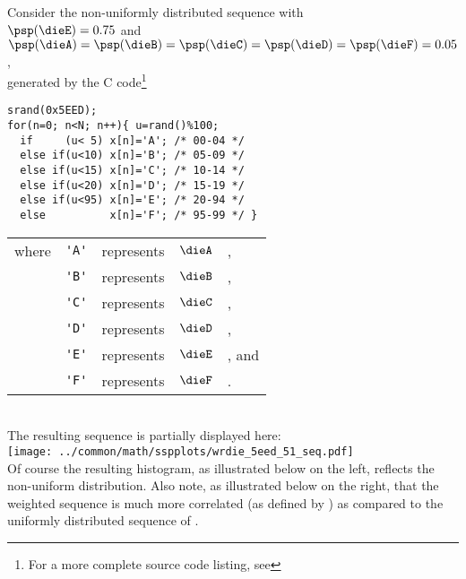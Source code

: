 \begin{example}
\label{ex:wrdie_sha}
Consider the non-uniformly distributed   sequence with 
    \\\indentx$\psp(\dieE)=0.75$ and $\psp(\dieA)=\psp(\dieB)=\psp(\dieC)=\psp(\dieD)=\psp(\dieF)=0.05$,\\
    generated by the C code\footnote{For a more complete source code listing, see }
\\\begin{minipage}{85mm}%
\begin{lstlisting}
srand(0x5EED);
for(n=0; n<N; n++){ u=rand()%100;
  if     (u< 5) x[n]='A'; /* 00-04 */ 
  else if(u<10) x[n]='B'; /* 05-09 */ 
  else if(u<15) x[n]='C'; /* 10-14 */ 
  else if(u<20) x[n]='D'; /* 15-19 */ 
  else if(u<95) x[n]='E'; /* 20-94 */ 
  else          x[n]='F'; /* 95-99 */ }
\end{lstlisting}
\end{minipage}%
\hspace{10mm}%
\begin{tabular}{lclcl}
  where & \lstinline!'A'! &represents& $\dieA$ &,
     \\ & \lstinline!'B'! &represents& $\dieB$ &,
     \\ & \lstinline!'C'! &represents& $\dieC$ &,
     \\ & \lstinline!'D'! &represents& $\dieD$ &,
     \\ & \lstinline!'E'! &represents& $\dieE$ &, and
     \\ & \lstinline!'F'! &represents& $\dieF$ &.
\end{tabular}
\\
     The resulting sequence is partially displayed here:
  \\\texttt{[image: ../common/math/sspplots/wrdie\_5eed\_51\_seq.pdf]}\\
  Of course the resulting histogram, as illustrated below on the left, reflects the non-uniform distribution.
  Also note, as illustrated below on the right, that the weighted sequence is much more correlated 
  (as defined by )
  as compared to the uniformly distributed 
   sequence of .

\end{example}
